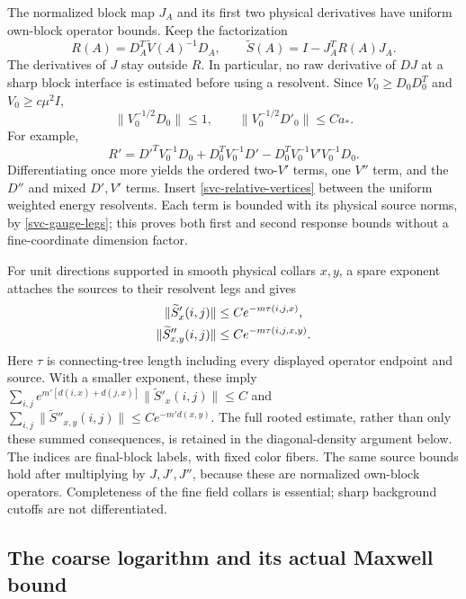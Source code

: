 \documentclass[11pt]{article}
\theoremstyle{remark}
\begin{document}
The normalized block map $J_A$ and its first two physical derivatives
have uniform own-block operator bounds. Keep the factorization
\begin{equation}
 R(A)=D_A^T\widetilde V(A)^{-1}D_A,
 \qquad \widetilde S(A)=I-J_A^TR(A)J_A.
 \label{svc-avoid-interface}
\end{equation}
The derivatives of $J$ stay outside $R$. In particular, no raw derivative
of $DJ$ at a sharp block interface is estimated before using a resolvent.
Since $V_0\ge D_0D_0^T$ and $V_0\ge c\mu^2I$,
\begin{equation}
 \|V_0^{-1/2}D_0\|\le1,\qquad
 \|V_0^{-1/2}D'_0\|\le Ca_*.
 \label{svc-gauge-legs}
\end{equation}
For example,
\begin{equation}
 R'=D'^TV_0^{-1}D_0+D_0^TV_0^{-1}D'
           -D_0^TV_0^{-1}V'V_0^{-1}D_0.
 \label{svc-first-response}
\end{equation}
Differentiating once more yields the ordered two-$V'$ terms, one
$V''$ term, and the $D''$ and mixed $D',V'$ terms. Insert
\eqref{svc-relative-vertices} between the uniform weighted energy
resolvents. Each term is bounded with its physical source norms,
by \eqref{svc-gauge-legs}; this proves both first and second response
bounds without a fine-coordinate dimension factor.

For unit directions supported in smooth physical collars $x,y$, a
spare exponent attaches the sources to their resolvent legs and gives
\begin{align}
 \|\widetilde S'_x(i,j)\|&\le Ce^{-m\tau(i,j,x)},\notag\\
 \|\widetilde S''_{x,y}(i,j)\|
      &\le Ce^{-m\tau(i,j,x,y)}.
 \label{svc-rooted-sources}
\end{align}
Here $\tau$ is connecting-tree length including every displayed operator
endpoint and source. With a smaller exponent, these imply
$\sum_{i,j}e^{m'[d(i,x)+d(j,x)]}\|\widetilde S'_x(i,j)\|\le C$
and $\sum_{i,j}\|\widetilde S''_{x,y}(i,j)\|\le Ce^{-m'd(x,y)}$.
The full rooted estimate, rather than only these summed consequences,
is retained in the diagonal-density argument below.
The indices are final-block labels, with fixed color fibers.
The same source bounds hold after multiplying by $J,J',J''$, because
these are normalized own-block operators. Completeness of the fine
field collars is essential; sharp background cutoffs are not differentiated.

\subsection{The coarse logarithm and its actual Maxwell bound}
\label{svc-maxwell-section}
\end{document}
